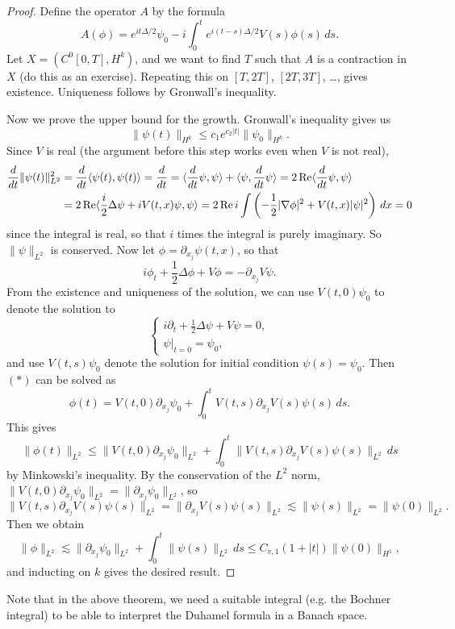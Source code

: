 \begin{proof}
  Define the operator $A$ by the formula
  \[
    A(\phi) = e^{it \Delta / 2} \psi_0 - i\int_0^t e^{i(t - s)\Delta / 2} V(s) \phi(s)\, ds.
  \]
  Let $X = (C^0[0, T], H^k)$, and we want to find
  $T$ such that $A$ is a contraction in $X$ (do this
  as an exercise). Repeating this
  on $[T, 2T]$, $[2T, 3T]$, \dots, gives
  existence. Uniqueness follows by Gronwall's inequality.

  Now we prove the upper bound for the growth.
  Gronwall's inequality gives us
  \[
    \|\psi(t)\|_{H^k} \le c_1 e^{c_2|t|} \|\psi_0\|_{H^k}.
  \]
  Since $V$ is real (the argument before this step
  works even when $V$ is not real),
  \begin{align*}
    \frac{d}{dt} \|\psi(t)\|_{L^2}^2
    &= \frac{d}{dt} \langle \psi(t), \psi(t) \rangle
    = \frac{d}{dt}
    = \langle \frac{d}{dt} \psi, \psi \rangle
    + \langle \psi, \frac{d}{dt} \psi \rangle
    = 2 \operatorname{Re} \langle \frac{d}{dt} \psi, \psi \rangle \\
    &= 2 \operatorname{Re} \langle \frac{i}{2} \Delta \psi + iV(t, x) \psi, \psi \rangle
    = 2\operatorname{Re} i \int \left(-\frac{1}{2} |\nabla \phi|^2 + V(t, x)|\psi|^2\right)\, dx = 0
  \end{align*}
  since the integral is real, so that $i$ times the
  integral is purely imaginary. So
  $\|\psi\|_{L^2}$ is conserved.
  Now let $\phi = \partial_{x_j} \psi(t, x)$, so that
  \[
    i\phi_t + \frac{1}{2} \Delta \phi + V \phi = -\partial_{x_j} V\psi. \tag{$*$}
  \]
  From the existence and uniqueness of the solution,
  we can use $V(t, 0) \psi_0$ to denote the solution
  to
  \[
    \begin{cases}
      i\partial_t + \frac{1}{2} \Delta \psi + V \psi = 0, \\
      \psi|_{t = 0} = \psi_0,
    \end{cases}
  \]
  and use $V(t, s) \psi_0$ denote the solution
  for initial condition $\psi(s) = \psi_0$. Then
  $(*)$ can be solved as
  \[
    \phi(t) = V(t, 0) \partial_{x_j} \psi_0
    + \int_0^t V(t, s) \partial_{x_j} V(s) \psi(s)\, ds.
  \]
  This gives
  \[
    \|\phi(t)\|_{L^2} \le
    \|V(t, 0) \partial_{x_j} \psi_0\|_{L^2}
    + \int_0^t \|V(t, s) \partial_{x_j} V(s) \psi(s)\|_{L^2}\, ds
  \]
  by Minkowski's inequality.  By the
  conservation of the $L^2$ norm,
  $\|V(t, 0) \partial_{x_j} \psi_0\|_{L^2} = \|\partial_{x_j} \psi_0 \|_{L^2}$, so
  \[
    \|V(t, s) \partial_{x_j} V(s) \psi(s)\|_{L^2}
    = \|\partial_{x_j} V(s) \psi(s)\|_{L^2}
    \lesssim \|\psi(s)\|_{L^2} = \|\psi(0)\|_{L^2}.
  \]
  Then we obtain
  \[
    \|\phi\|_{L^2} \lesssim
    \|\partial_{x_j} \psi_0\|_{L^2}
    + \int_0^t \|\psi(s)\|_{L^2}\, ds
    \le C_{v, 1} (1 + |t|) \|\psi(0)\|_{H^1},
  \]
  and inducting on $k$ gives the desired result.
\end{proof}

\begin{remark}
  Note that in the above theorem, we need a suitable
  integral (e.g. the Bochner integral) to be able to
  interpret the Duhamel formula in a Banach space.
\end{remark}
